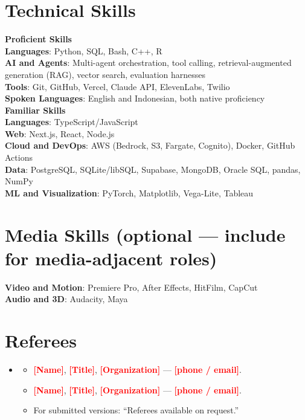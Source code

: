 \documentclass[letterpaper,11pt]{article}
\newcommand{\resumeItem}[1]{\item\small{{#1 \vspace{-2pt}}}}
\newcommand{\tbd}[1]{\textcolor{red}{\textbf{[#1]}}}
\newcommand{\resumeSubHeadingListStart}{\begin{itemize}[leftmargin=0.15in, label={}]}
\newcommand{\resumeSubHeadingListEnd}{\end{itemize}}
\newcommand{\resumeItemListStart}{\begin{itemize}}
\newcommand{\resumeItemListEnd}{\end{itemize}\vspace{-5pt}}
\begin{document}
\section{Technical Skills}
 \begin{itemize}[leftmargin=0.15in, label={}]
    \small{\item{
     \textbf{Proficient Skills} \\
     \textbf{Languages}{: Python, SQL, Bash, C++, R} \\
     \textbf{AI and Agents}{: Multi-agent orchestration, tool calling, retrieval-augmented generation (RAG), vector search, evaluation harnesses} \\
     \textbf{Tools}{: Git, GitHub, Vercel, Claude API, ElevenLabs, Twilio} \\
     \textbf{Spoken Languages}{: English and Indonesian, both native proficiency} \\[4pt]
     \textbf{Familiar Skills} \\
     \textbf{Languages}{: TypeScript/JavaScript} \\
     \textbf{Web}{: Next.js, React, Node.js} \\
     \textbf{Cloud and DevOps}{: AWS (Bedrock, S3, Fargate, Cognito), Docker, GitHub Actions} \\
     \textbf{Data}{: PostgreSQL, SQLite/libSQL, Supabase, MongoDB, Oracle SQL, pandas, NumPy} \\
     \textbf{ML and Visualization}{: PyTorch, Matplotlib, Vega-Lite, Tableau}
    }}
 \end{itemize}

\section{Media Skills (optional --- include for media-adjacent roles)}
 \begin{itemize}[leftmargin=0.15in, label={}]
    \small{\item{
     \textbf{Video and Motion}{: Premiere Pro, After Effects, HitFilm, CapCut} \\
     \textbf{Audio and 3D}{: Audacity, Maya}
    }}
 \end{itemize}

\section{Referees}
  \resumeSubHeadingListStart
    \item[]
    \resumeItemListStart
      \resumeItem{\tbd{Name}, \tbd{Title}, \tbd{Organization} --- \tbd{phone / email}.}
      \resumeItem{\tbd{Name}, \tbd{Title}, \tbd{Organization} --- \tbd{phone / email}.}
      \resumeItem{For submitted versions: ``Referees available on request.''}
    \resumeItemListEnd
  \resumeSubHeadingListEnd
\end{document}
